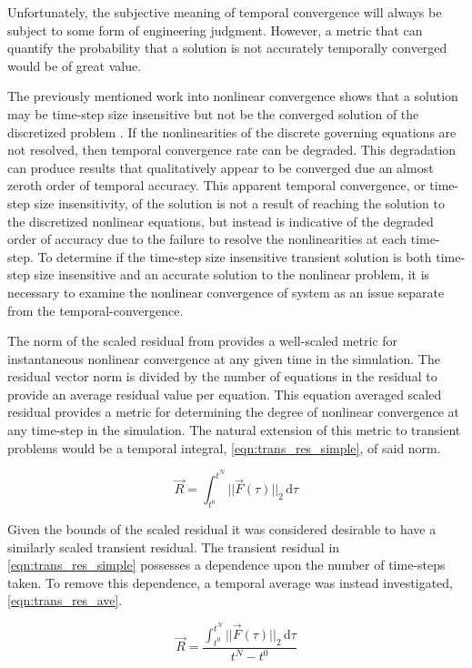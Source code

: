 Unfortunately, the subjective meaning of temporal convergence will always be subject to some form of engineering judgment.
However, a metric that can quantify the probability that a solution is not accurately temporally converged would be of great value.

The previously mentioned work into nonlinear convergence shows that a solution may be time-step size insensitive but not be the converged solution of the discretized problem \cite{Knoll2001}.
If the nonlinearities of the discrete governing equations are not resolved, then temporal convergence rate can be degraded.
This degradation can produce results that qualitatively appear to be converged due an almost zeroth order of temporal accuracy.
This apparent temporal convergence, or time-step size insensitivity, of the solution is not a result of reaching the solution to the discretized nonlinear equations, but instead is indicative of the degraded order of accuracy due to the failure to resolve the nonlinearities at each time-step.
To determine if the time-step size insensitive transient solution is both time-step size insensitive and an accurate solution to the nonlinear problem, it is necessary to examine the nonlinear convergence of system as an issue separate from the temporal-convergence.

The norm of the scaled residual from  provides a well-scaled metric for instantaneous nonlinear convergence at any given time in the simulation.
The residual vector norm is divided by the number of equations in the residual to provide an average residual value per equation.
This equation averaged scaled residual provides a metric for determining the degree of nonlinear convergence at any time-step in the simulation.
The natural extension of this metric to transient problems would be a temporal integral, \eqref{eqn:trans_res_simple}, of said norm.

\begin{equation}
\label{eqn:trans_res_simple}
\vec{R} = \int_{t^{0}}^{t^{N}} ||\vec{F}(\tau)||_2 \,\mathrm{d} \tau
\end{equation}

Given the bounds of the scaled residual it was considered desirable to have a similarly scaled transient residual.
The transient residual in \eqref{eqn:trans_res_simple} possesses a dependence upon the number of time-steps taken.
To remove this dependence, a temporal average was instead investigated, \eqref{eqn:trans_res_ave}.

\begin{equation}
\label{eqn:trans_res_ave}
\vec{R} = \frac{\int_{t^{0}}^{t^{N}} ||\vec{F}(\tau)||_2 \,\mathrm{d} \tau}{t^{N} - t^{0}}
\end{equation}

